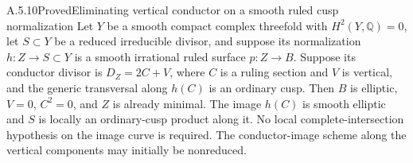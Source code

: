 \begin{statement}{A.5.10}{Proved}{Eliminating vertical conductor on a smooth ruled cusp normalization}
Let $Y$ be a smooth compact complex threefold with
$H^2(Y,\mathbb Q)=0$, let $S\subset Y$ be a reduced
irreducible divisor, and suppose its normalization
$h:Z\to S\subset Y$ is a smooth irrational
ruled surface $p:Z\to B$.
Suppose its conductor divisor is $D_Z=2C+V$, where
$C$ is a ruling section and $V$ is vertical, and
the generic transversal along $h(C)$ is an ordinary cusp.
Then $B$ is elliptic, $V=0$, $C^2=0$, and $Z$ is
already minimal.
The image $h(C)$ is smooth elliptic and $S$ is locally
an ordinary-cusp product along it. No local
complete-intersection hypothesis on the image curve is
required. The conductor-image scheme along the vertical
components may initially be nonreduced.
\end{statement}
